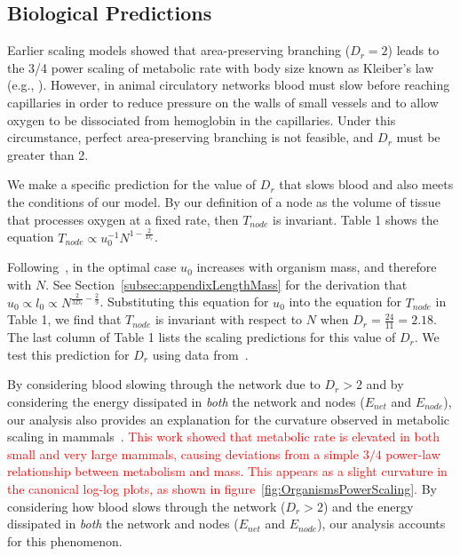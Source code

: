 \documentclass[12pt]{article}
\newcommand{\red}[1]{\textcolor{red}{#1}}
\begin{document}
\subsection{Biological Predictions}
\label{sec:bio-predictions}

Earlier scaling models showed that area-preserving
branching ($D_r = 2$) leads to the 3/4 power scaling of metabolic rate with body
size known as Kleiber's law (e.g., \cite{west97, banavar10}).
However, in animal circulatory networks blood must slow before reaching capillaries in order to
reduce pressure on the walls of small vessels and to allow oxygen to be
dissociated from hemoglobin in the capillaries.   Under this circumstance,
perfect area-preserving branching is not feasible, and $D_r$ must be greater than 2.

We make a specific prediction for the value of $D_r$ that slows blood and also meets the conditions of our model. By our definition of a node as the volume of tissue that processes oxygen at a fixed rate, then $T_{node}$ is invariant. Table 1 shows the equation $T_{node} \propto u_0^{-1}N^{1-\frac{2}{D_r}}$.

Following~\cite{banavar10}, in the optimal case $u_0$ increases with organism mass, and therefore with $N$. See Section~\ref{subsec:appendixLengthMass} for the derivation that $u_0 \propto l_0 \propto N^{\frac{2}{3D_r} - \frac{2}{9}}$. Substituting this equation for $u_0$ into the equation for $T_{node}$ in Table 1, we find that $T_{node}$ is invariant with respect to $N$ when $D_r = \frac{24}{11} = 2.18$. The last column of Table 1 lists the scaling predictions for this value of $D_r$. We test this prediction for $D_r$ using data from~\cite{kolokotrones2010curvature}.

By considering blood slowing through the network due to $D_r > 2$ and by considering the energy dissipated in \emph{both} the network and 
nodes ($E_{net}$ and $E_{node}$), our analysis also provides an explanation for the curvature observed in
metabolic scaling in mammals~\cite{kolokotrones2010curvature}.  \red{This
work showed that metabolic rate is elevated in both small and very large mammals, causing
deviations from a simple $3/4$ power-law relationship between metabolism and
mass.  This appears as a slight curvature in the canonical log-log
plots, as shown in figure~\ref{fig:OrganismsPowerScaling}.}
By considering how blood slows through the network ($D_r > 2$) and the energy dissipated in \emph{both} the network and 
nodes ($E_{net}$ and $E_{node}$), our analysis accounts for this phenomenon.
\end{document}
